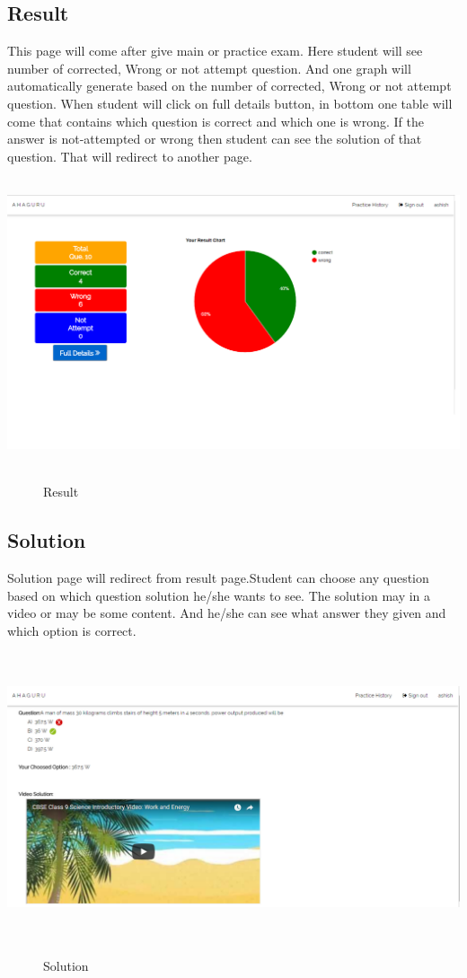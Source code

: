 \subsection{Result}
This page will come after give main or practice exam. Here student will see number of corrected, Wrong or not attempt question. And one graph will automatically generate based on the number of corrected, Wrong or not attempt question. When student will click on full details button, in bottom one table will come that contains which question is correct and which one is wrong. If the answer is not-attempted or wrong then student can see the solution of that question. That will redirect to another page.
\begin{center}
	\includegraphics[width=13.5cm, height=8.5cm]{result.png}
	\begin{figure}[h!]
		\centering
		\caption{Result}%
	\end{figure}
\end{center} \break
\subsection{Solution}
Solution page will redirect from result page.Student can choose any question based on which question solution he/she wants to see. The solution may in a video or may be some content. And he/she can see what answer they given and which option is correct.
\begin{center}
	\includegraphics[width=13.5cm, height=8.5cm]{solution.png}
	\begin{figure}[h!]
		\centering
		\caption{Solution}%
	\end{figure}
\end{center} \break
